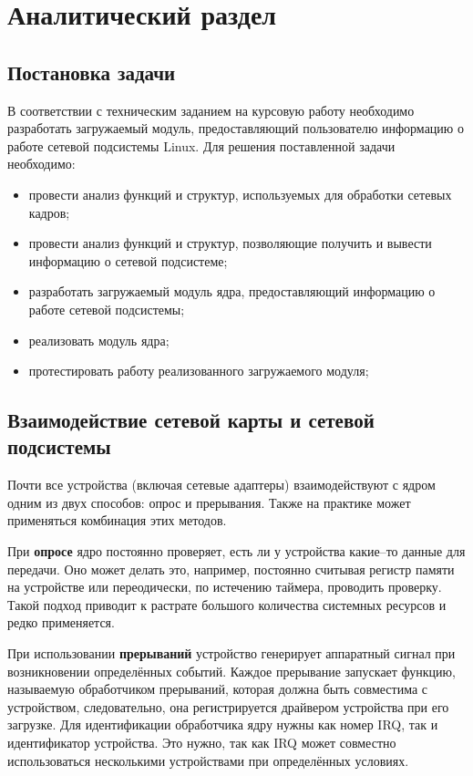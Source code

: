 \chapter{Аналитический раздел}

\section{Постановка задачи}

В соответствии с техническим заданием на курсовую работу необходимо разработать загружаемый модуль, предоставляющий пользователю информацию о работе сетевой подсистемы Linux. Для решения поставленной задачи необходимо:
\begin{itemize}[label=---]
	\item провести анализ функций и структур, используемых для обработки сетевых кадров;
	\item провести анализ функций и структур, позволяющие получить и вывести информацию о сетевой подсистеме;
	\item разработать загружаемый модуль ядра, предоставляющий информацию о работе сетевой подсистемы;
	\item реализовать модуль ядра;
	\item протестировать работу реализованного загружаемого модуля;
\end{itemize}

\section{Взаимодействие сетевой карты и сетевой подсистемы}

Почти все устройства (включая сетевые адаптеры) взаимодействуют с ядром одним из двух способов: опрос и прерывания. Также на практике может применяться комбинация этих методов.

При \textbf{опросе} ядро постоянно проверяет, есть ли у устройства какие--то данные для передачи. Оно может делать это, например, постоянно считывая регистр памяти на устройстве или переодически, по истечению таймера, проводить проверку. Такой подход приводит к растрате большого количества системных ресурсов и редко применяется.

При использовании \textbf{прерываний} устройство генерирует аппаратный сигнал при возникновении определённых событий. Каждое прерывание запускает функцию, называемую обработчиком прерываний, которая должна быть совместима с
устройством, следовательно, она регистрируется драйвером устройства при его загрузке. Для идентификации обработчика ядру нужны как номер IRQ, так и идентификатор устройства. Это нужно, так как IRQ может совместно использоваться несколькими устройствами при определённых условиях.

